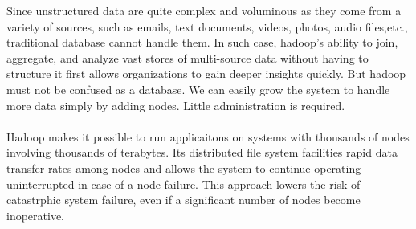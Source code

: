 \documentclass[a4paper,12pt,oneside]{report}
\begin{document}
\par Since unstructured data are quite complex and voluminous as they come from a variety
of sources, such as emails, text documents, videos, photos, audio files,etc., traditional
database cannot handle them. In such case, hadoop’s ability to join, aggregate, and analyze
vast stores of multi-source data without having to structure it first allows organizations to
gain deeper insights quickly. But hadoop must not be confused as a database. 
We can easily grow the system to handle more data simply by adding nodes. Little administration is required.\\
\\
Hadoop makes it possible to run applicaitons on systems with thousands of nodes involving thousands of terabytes. Its distributed file system facilities rapid
data transfer rates among nodes and allows the system to continue operating uninterrupted in case of a node failure. This approach lowers the risk of catastrphic system failure,
even if a significant number of nodes become inoperative.
\end{document}
